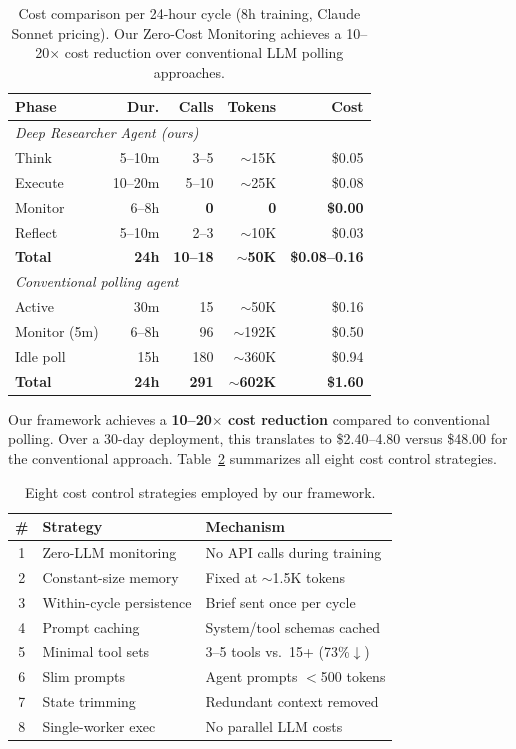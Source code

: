 \begin{table}[t]
\centering
\caption{Cost comparison per 24-hour cycle (8h training, Claude Sonnet pricing). Our Zero-Cost Monitoring achieves a 10--20$\times$ cost reduction over conventional LLM polling approaches.}
\label{tab:cost}
\begin{tabular}{lrrrr}
\toprule
\textbf{Phase} & \textbf{Dur.} & \textbf{Calls} & \textbf{Tokens} & \textbf{Cost} \\
\midrule
\multicolumn{5}{l}{\textit{Deep Researcher Agent (ours)}} \\
\quad Think & 5--10m & 3--5 & $\sim$15K & \$0.05 \\
\quad Execute & 10--20m & 5--10 & $\sim$25K & \$0.08 \\
\quad Monitor & 6--8h & \textbf{0} & \textbf{0} & \textbf{\$0.00} \\
\quad Reflect & 5--10m & 2--3 & $\sim$10K & \$0.03 \\
\quad \textbf{Total} & \textbf{24h} & \textbf{10--18} & \textbf{$\sim$50K} & \textbf{\$0.08--0.16} \\
\midrule
\multicolumn{5}{l}{\textit{Conventional polling agent}} \\
\quad Active & 30m & 15 & $\sim$50K & \$0.16 \\
\quad Monitor (5m) & 6--8h & 96 & $\sim$192K & \$0.50 \\
\quad Idle poll & 15h & 180 & $\sim$360K & \$0.94 \\
\quad \textbf{Total} & \textbf{24h} & \textbf{291} & \textbf{$\sim$602K} & \textbf{\$1.60} \\
\bottomrule
\end{tabular}
\end{table}

Our framework achieves a \textbf{10--20$\times$ cost reduction} compared to conventional polling. Over a 30-day deployment, this translates to \$2.40--4.80 versus \$48.00 for the conventional approach. Table~\ref{tab:strategies} summarizes all eight cost control strategies.

\begin{table}[t]
\centering
\caption{Eight cost control strategies employed by our framework.}
\label{tab:strategies}
\begin{tabular}{clp{4.5cm}}
\toprule
\textbf{\#} & \textbf{Strategy} & \textbf{Mechanism} \\
\midrule
1 & Zero-LLM monitoring & No API calls during training \\
2 & Constant-size memory & Fixed at $\sim$1.5K tokens \\
3 & Within-cycle persistence & Brief sent once per cycle \\
4 & Prompt caching & System/tool schemas cached \\
5 & Minimal tool sets & 3--5 tools vs.\ 15+ (73\%$\downarrow$) \\
6 & Slim prompts & Agent prompts $<$500 tokens \\
7 & State trimming & Redundant context removed \\
8 & Single-worker exec & No parallel LLM costs \\
\bottomrule
\end{tabular}
\end{table}

